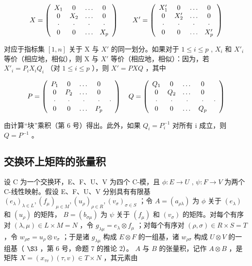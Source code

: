 \[
X = \left( \begin{array}{c c c c} X _ {1} & 0 & \ldots & 0 \\ 0 & X _ {2} & \ldots & 0 \\ \cdot & \cdot & \cdot & \cdot \\ 0 & 0 & \ldots & X _ {p} \end{array} \right) \qquad X ^ {\prime} = \left( \begin{array}{c c c c} X _ {1} ^ {\prime} & 0 & \ldots & 0 \\ 0 & X _ {2} ^ {\prime} & \ldots & 0 \\ \cdot & \cdot & \cdot & \cdot \\ 0 & 0 & \ldots & X _ {p} ^ {\prime} \end{array} \right)
\]

对应于指标集 \([1, n]\) 关于 X 与 \(X'\) 的同一划分。如果对于 \(1 \leqslant i \leqslant p\) , \(X_i\) 和 \(X'_i\) 等价（相应地，相似），则 X 与 \(X'\) 等价（相应地，相似）：因为，若 \(X'_i = P_i X_i Q_i\) （对 \(1 \leqslant i \leqslant p\) ），则 \(X' = PXQ\) ，其中

\[
P = \left( \begin{array}{c c c c c} P _ {1} & 0 & \dots & 0 \\ 0 & P _ {2} & \dots & 0 \\ \cdot & \cdot & \cdot & \cdot & \cdot \\ 0 & 0 & \dots & P _ {p} \end{array} \right) \quad Q = \left( \begin{array}{c c c c c} Q _ {1} & 0 & \dots & 0 \\ 0 & Q _ {2} & \dots & 0 \\ \cdot & \cdot & \cdot & \cdot & \cdot \\ 0 & 0 & \dots & Q _ {p} \end{array} \right)
\]

由计算“块”乘积（第 6 号）得出。此外，如果 \(Q_{i} = P_{i}^{-1}\) 对所有 i 成立，则 \(Q = P^{-1}\) 。

\subsection{交换环上矩阵的张量积}

设 C 为一个交换环，E、F、U、V 为四个 C-模，且 \(\phi:E\to U\) , \(\psi:F\to V\) 为两个 C-线性映射。假设 E、F、U、V 分别具有有限基 \((e_{\lambda})_{\lambda \in L}, (f_{\mu})_{\mu \in M}, (u_{\rho})_{\rho \in R}, (v_{\sigma})_{\sigma \in S}\) ；令 \(A = (a_{\rho \lambda})\) 为 \(\phi\) 关于 \((e_{\lambda})\) 和 \((u_{\rho})\) 的矩阵， \(B = (b_{\sigma \mu})\) 为 \(\psi\) 关于 \((f_{\mu})\) 和 \((v_{\sigma})\) 的矩阵。对每个有序对 \((\lambda, \mu) \in L \times M = N\) ，令 \(g_{\lambda \mu} = e_{\lambda} \otimes f_{\mu}\) ；对每个有序对 \((\rho, \sigma) \in R \times S = T\) ，令 \(w_{\rho \sigma} = u_{\rho} \otimes v_{\sigma}\) ；于是诸 \(g_{\lambda \mu}\) 构成 \(E \otimes F\) 的一组基，诸 \(w_{\rho \sigma}\) 构成 \(U \otimes V\) 的一组基（ \(\S 3\) ，第 6 号，命题 7 的推论 2）。 \(A\) 与 \(B\) 的张量积，记作 \(A \otimes B\) ，是矩阵 \(X = (x_{\tau v})(\tau, v) \in T \times N\) ，其元素由

